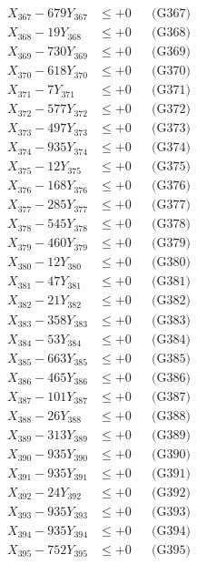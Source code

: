 \documentclass[a4paper,10pt]{article}
\begin{document}
{\begin{align}
X_{367} - 679Y_{367} &\leq +0 && \text{(G367)} \\
X_{368} - 19Y_{368} &\leq +0 && \text{(G368)} \\
X_{369} - 730Y_{369} &\leq +0 && \text{(G369)} \\
X_{370} - 618Y_{370} &\leq +0 && \text{(G370)} \\
\allowbreak
X_{371} - 7Y_{371} &\leq +0 && \text{(G371)} \\
X_{372} - 577Y_{372} &\leq +0 && \text{(G372)} \\
X_{373} - 497Y_{373} &\leq +0 && \text{(G373)} \\
X_{374} - 935Y_{374} &\leq +0 && \text{(G374)} \\
X_{375} - 12Y_{375} &\leq +0 && \text{(G375)} \\
X_{376} - 168Y_{376} &\leq +0 && \text{(G376)} \\
X_{377} - 285Y_{377} &\leq +0 && \text{(G377)} \\
X_{378} - 545Y_{378} &\leq +0 && \text{(G378)} \\
X_{379} - 460Y_{379} &\leq +0 && \text{(G379)} \\
X_{380} - 12Y_{380} &\leq +0 && \text{(G380)} \\
\allowbreak
X_{381} - 47Y_{381} &\leq +0 && \text{(G381)} \\
X_{382} - 21Y_{382} &\leq +0 && \text{(G382)} \\
X_{383} - 358Y_{383} &\leq +0 && \text{(G383)} \\
X_{384} - 53Y_{384} &\leq +0 && \text{(G384)} \\
X_{385} - 663Y_{385} &\leq +0 && \text{(G385)} \\
X_{386} - 465Y_{386} &\leq +0 && \text{(G386)} \\
X_{387} - 101Y_{387} &\leq +0 && \text{(G387)} \\
X_{388} - 26Y_{388} &\leq +0 && \text{(G388)} \\
X_{389} - 313Y_{389} &\leq +0 && \text{(G389)} \\
X_{390} - 935Y_{390} &\leq +0 && \text{(G390)} \\
\allowbreak
X_{391} - 935Y_{391} &\leq +0 && \text{(G391)} \\
X_{392} - 24Y_{392} &\leq +0 && \text{(G392)} \\
X_{393} - 935Y_{393} &\leq +0 && \text{(G393)} \\
X_{394} - 935Y_{394} &\leq +0 && \text{(G394)} \\
X_{395} - 752Y_{395} &\leq +0 && \text{(G395)} \\

\end{align}}
\end{document}
